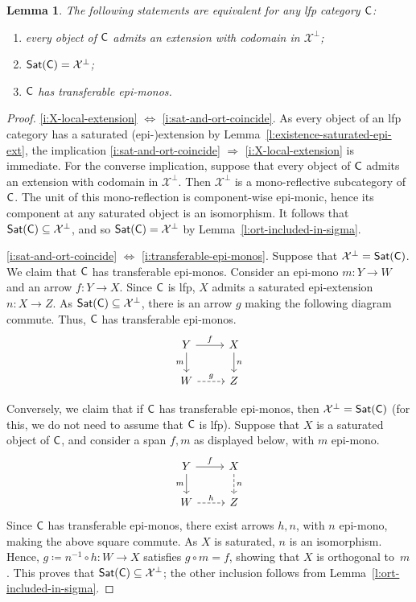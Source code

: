 \documentclass[a4paper,10pt,reqno]{amsart}
\newtheorem{lemma}[theorem]{Lemma}
\theoremstyle{definition}
\theoremstyle{remark}
\newcommand{\cat}{{\sf C}}								%
\newcommand{\Sat}{{\sf Sat}}								%
\newcommand{\ar}[1]{\mathcal{#1}}							%
\newcommand{\X}{\ar{X}}									%
\newcommand{\ort}[1]{{#1}^{\perp}}						%
\newcommand{\IMP}{\Rightarrow}						%
\newcommand{\IFF}{\Leftrightarrow}						%
\begin{document}
\begin{lemma}\label{l:ort-vs-sat}
The following statements are equivalent for any lfp category $\cat$:
\begin{enumerate}[label=(\arabic*)]
\item\label{i:X-local-extension} every object of $\cat$ admits an extension with codomain in $\ort{\X}$;
\item\label{i:sat-and-ort-coincide} $\Sat(\cat)=\ort{\X}$;
\item\label{i:transferable-epi-monos} $\cat$ has transferable epi-monos.
\end{enumerate}
\end{lemma}

\begin{proof}
\ref{i:X-local-extension} $\IFF$ \ref{i:sat-and-ort-coincide}. As every object of an lfp category has a saturated (epi-)extension by Lemma~\ref{l:existence-saturated-epi-ext}, the implication \ref{i:sat-and-ort-coincide} $\IMP$ \ref{i:X-local-extension} is immediate. For the converse implication, suppose that every object of $\cat$ admits an extension with codomain in $\ort{\X}$. Then $\ort{\X}$ is a mono-reflective subcategory of $\cat$. The unit of this mono-reflection is component-wise epi-monic, hence its component at any saturated object is an isomorphism. It follows that $\Sat(\cat)\subseteq \ort{\X}$, and so $\Sat(\cat)=\ort{\X}$ by Lemma~\ref{l:ort-included-in-sigma}.

\ref{i:sat-and-ort-coincide} $\IFF$ \ref{i:transferable-epi-monos}.
Suppose that $\ort{\X} = \Sat(\cat)$. We claim that $\cat$ has transferable epi-monos. Consider an epi-mono $m\colon Y\to W$ and an arrow $f\colon Y\to X$. Since $\cat$ is lfp, $X$ admits a saturated epi-extension $n\colon X\to Z$. As $\Sat(\cat)\subseteq \ort{\X}$, there is an arrow $g$ making the following diagram commute. Thus, $\cat$ has transferable epi-monos.
\[\begin{tikzcd}
Y \arrow{d}[swap]{m} \arrow{r}{f} & X \arrow{d}{n} \\
W \arrow[dashed]{r}{g} & Z
\end{tikzcd}\]

Conversely, we claim that if $\cat$ has transferable epi-monos, then $\ort{\X} = \Sat(\cat)$ (for this, we do not need to assume that $\cat$ is lfp). 
%
Suppose that $X$ is a saturated object of $\cat$, and consider a span $f,m$ as displayed below, with $m$ epi-mono.
\[\begin{tikzcd}
Y \arrow{d}[swap]{m} \arrow{r}{f} & X \arrow[dashed]{d}{n} \\
W \arrow[dashed]{r}{h} & Z
\end{tikzcd}\]
Since $\cat$ has transferable epi-monos, there exist arrows $h,n$, with $n$ epi-mono, making the above square commute. As $X$ is saturated, $n$ is an isomorphism. Hence, $g\coloneqq n^{-1}\circ h\colon W\to X$ satisfies $g\circ m = f$, showing that $X$ is orthogonal to~$m$. This proves that $\Sat(\cat)\subseteq \ort{\X}$; the other inclusion follows from Lemma~\ref{l:ort-included-in-sigma}.
\end{proof}
\end{document}
